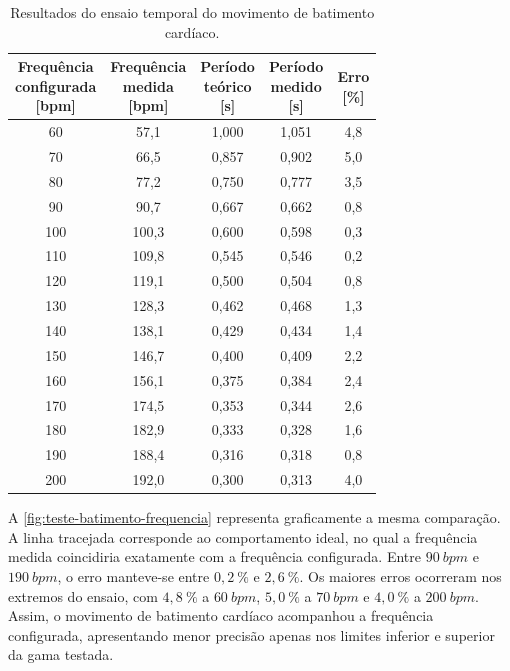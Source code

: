 \begin{table}[!htbp]
  \centering
  \caption{Resultados do ensaio temporal do movimento de batimento cardíaco.}
  \label{tab:teste-frequencia-batimento}
  \footnotesize
  \setlength{\tabcolsep}{8pt}
  \begin{tabular}{ccccc}
    \toprule
    \shortstack{Frequência\\configurada\\{[bpm]}}
    & \shortstack{Frequência\\medida\\{[bpm]}}
    & \shortstack{Período\\teórico\\{[s]}}
    & \shortstack{Período\\medido\\{[s]}}
    & \shortstack{Erro\\{[\%]}}\\
    \midrule
    60  & 57,1  & 1,000 & 1,051 & 4,8\\
    70  & 66,5  & 0,857 & 0,902 & 5,0\\
    80  & 77,2  & 0,750 & 0,777 & 3,5\\
    90  & 90,7  & 0,667 & 0,662 & 0,8\\
    100 & 100,3 & 0,600 & 0,598 & 0,3\\
    110 & 109,8 & 0,545 & 0,546 & 0,2\\
    120 & 119,1 & 0,500 & 0,504 & 0,8\\
    130 & 128,3 & 0,462 & 0,468 & 1,3\\
    140 & 138,1 & 0,429 & 0,434 & 1,4\\
    150 & 146,7 & 0,400 & 0,409 & 2,2\\
    160 & 156,1 & 0,375 & 0,384 & 2,4\\
    170 & 174,5 & 0,353 & 0,344 & 2,6\\
    180 & 182,9 & 0,333 & 0,328 & 1,6\\
    190 & 188,4 & 0,316 & 0,318 & 0,8\\
    200 & 192,0 & 0,300 & 0,313 & 4,0\\
    \bottomrule
  \end{tabular}
\end{table}

A \cref{fig:teste-batimento-frequencia} representa graficamente a mesma comparação. A linha tracejada corresponde ao comportamento ideal, no qual a frequência medida coincidiria exatamente com a frequência configurada. Entre \(90~bpm\) e \(190~bpm\), o erro manteve-se entre \(0,2~\%\) e \(2,6~\%\). Os maiores erros ocorreram nos extremos do ensaio, com \(4,8~\%\) a \(60~bpm\), \(5,0~\%\) a \(70~bpm\) e \(4,0~\%\) a \(200~bpm\). Assim, o movimento de batimento cardíaco acompanhou a frequência configurada, apresentando menor precisão apenas nos limites inferior e superior da gama testada.

